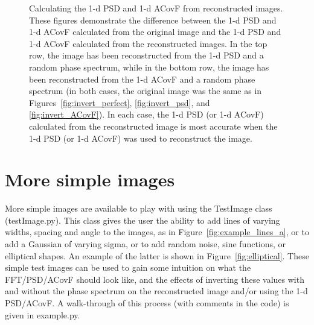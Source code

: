 \documentclass[11pt,preprint]{aastex}
\begin{document}
\begin{figure}[htbp]
\caption{{\small
Calculating the 1-d PSD and 1-d ACovF from reconstructed images. These figures demonstrate the difference between the 1-d PSD and 1-d ACovF calculated from the original image and the 1-d PSD and 1-d ACovF calculated from the reconstructed images. In the top row, the image has been reconstructed from the 1-d PSD and a random phase spectrum, while in the bottom row, the image has been reconstructed from the 1-d ACovF and a random phase spectrum (in both cases, the original image was the same as in Figures~\ref{fig:invert_perfect}, \ref{fig:invert_psd}, and \ref{fig:invert_ACovF}). In each case, the 1-d PSD (or 1-d ACovF) calculated from the reconstructed image is most accurate when the 1-d PSD (or 1-d ACovF) was used to reconstruct the image. }}
\label{fig:invert_compare1d}
\end{figure}


\section{More simple images}

More simple images are available to play with using the TestImage class (testImage.py). This class gives the user the ability to add lines of varying widths, spacing and angle to the images, as in Figure~\ref{fig:example_lines_a}, or to add a Gaussian of varying sigma, or to add random noise, sine functions, or elliptical shapes. An example of the latter is shown in Figure~\ref{fig:elliptical}.  These simple test images can be used to gain some intuition on what the FFT/PSD/ACovF should look like, and the effects of inverting these values with and without the phase spectrum on the reconstructed image and/or using the 1-d PSD/ACovF. A walk-through of this process (with comments in the code) is given in example.py.
\end{document}
